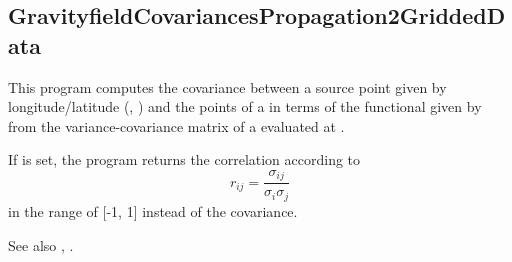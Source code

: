 \clearpage
\subsection{GravityfieldCovariancesPropagation2GriddedData}\label{GravityfieldCovariancesPropagation2GriddedData}
This program computes the covariance between a source point given
by longitude/latitude (, ) and the points of a 
in terms of the functional given by  from the variance-covariance
matrix of a  evaluated at .

If  is set, the program returns the correlation according to
\begin{equation}
r_{ij} = \frac{\sigma_{ij}}{\sigma_i \sigma_j}
\end{equation}
in the range of [-1, 1] instead of the covariance.

See also , .


